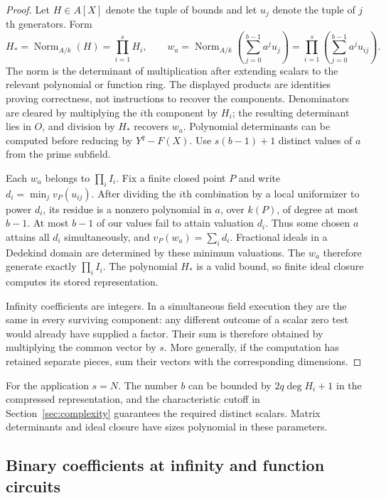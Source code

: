 \begin{proof}
Let $H\in A[X]$ denote the tuple of bounds and let $u_j$ denote the tuple
of $j$th generators.  Form
\[
 H_* =\operatorname{Norm}_{A/k}(H)=\prod_{i=1}^s H_i,
 \qquad
 w_a=\operatorname{Norm}_{A/k}\left(\sum_{j=0}^{b-1}a^ju_j\right)
     =\prod_{i=1}^s\left(\sum_{j=0}^{b-1}a^ju_{ij}\right).
\]
The norm is the determinant of multiplication after extending scalars
to the relevant polynomial or function ring.  The displayed products
are identities proving correctness, not instructions to recover the
components.  Denominators are cleared by multiplying the $i$th component
by $H_i$; the resulting determinant lies in $O$, and division by $H_*$
recovers $w_a$.  Polynomial determinants can be computed before reducing
by $Y^q-F(X)$.  Use $s(b-1)+1$ distinct values of $a$ from the prime
subfield.

Each $w_a$ belongs to $\prod_i I_i$.  Fix a finite closed point $P$ and
write $d_i=\min_jv_P(u_{ij})$.  After dividing the $i$th combination by
a local uniformizer to power $d_i$, its residue is a nonzero polynomial
in $a$, over $k(P)$, of degree at most $b-1$.  At most $b-1$ of our
values fail to attain valuation $d_i$.  Thus some chosen $a$ attains all
$d_i$ simultaneously, and $v_P(w_a)=\sum_i d_i$.  Fractional ideals in
a Dedekind domain are determined by these minimum valuations.  The
$w_a$ therefore generate exactly $\prod_i I_i$.  The polynomial $H_*$
is a valid bound, so finite ideal closure computes its stored
representation.

Infinity coefficients are integers.  In a simultaneous field execution
they are the same in every surviving component: any different outcome
of a scalar zero test would already have supplied a factor.  Their sum
is therefore obtained by multiplying the common vector by $s$.  More
generally, if the computation has retained separate pieces, sum their
vectors with the corresponding dimensions.
\end{proof}

For the application $s=N$.  The number $b$ can be bounded by
$2q\deg H_i+1$ in the compressed representation, and the characteristic
cutoff in Section~\ref{sec:complexity} guarantees the required distinct
scalars.  Matrix determinants and ideal closure have sizes polynomial
in these parameters.

\subsection{Binary coefficients at infinity and function circuits}


